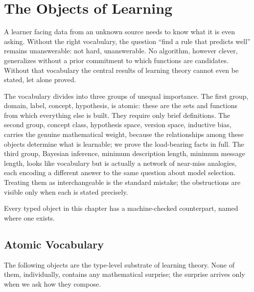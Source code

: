 
\chapter{The Objects of Learning}
\label{ch:objects}

A learner facing data from an unknown source needs to know what it is even asking. Without the right vocabulary, the question ``find a rule that predicts well'' remains unanswerable: not hard, unanswerable. No algorithm, however clever, generalizes without a prior commitment to which functions are candidates. Without that vocabulary the central results of learning theory cannot even be stated, let alone proved.

The vocabulary divides into three groups of unequal importance. The first group, domain, label, concept, hypothesis, is atomic: these are the sets and functions from which everything else is built. They require only brief definitions. The second group, concept class, hypothesis space, version space, inductive bias, carries the genuine mathematical weight, because the relationships among these objects determine what is learnable; we prove the load-bearing facts in full. The third group, Bayesian inference, minimum description length, minimum message length, looks like vocabulary but is actually a network of near-miss analogies, each encoding a different answer to the same question about model selection. Treating them as interchangeable is the standard mistake; the obstructions are visible only when each is stated precisely.

Every typed object in this chapter has a machine-checked counterpart, named where one exists.

\section{Atomic Vocabulary}
\label{sec:atoms}

The following objects are the type-level substrate of learning theory. None of them, individually, contains any mathematical surprise; the surprise arrives only when we ask how they compose.

